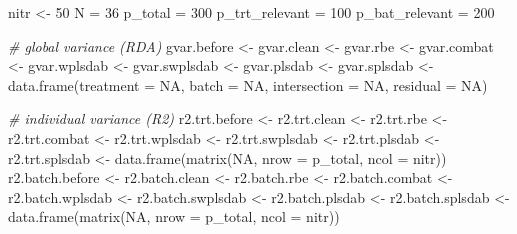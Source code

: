 \documentclass[
]{book}
\newenvironment{Shaded}{\begin{snugshade}}{\end{snugshade}}
\newcommand{\AttributeTok}[1]{\textcolor[rgb]{0.77,0.63,0.00}{#1}}
\newcommand{\CommentTok}[1]{\textcolor[rgb]{0.56,0.35,0.01}{\textit{#1}}}
\newcommand{\ConstantTok}[1]{\textcolor[rgb]{0.00,0.00,0.00}{#1}}
\newcommand{\DecValTok}[1]{\textcolor[rgb]{0.00,0.00,0.81}{#1}}
\newcommand{\FunctionTok}[1]{\textcolor[rgb]{0.00,0.00,0.00}{#1}}
\newcommand{\NormalTok}[1]{#1}
\newcommand{\OtherTok}[1]{\textcolor[rgb]{0.56,0.35,0.01}{#1}}
\begin{document}
\begin{Shaded}
\begin{Highlighting}[]
\NormalTok{nitr }\OtherTok{\textless{}{-}} \DecValTok{50}
\NormalTok{N }\OtherTok{=} \DecValTok{36}
\NormalTok{p\_total }\OtherTok{=} \DecValTok{300}
\NormalTok{p\_trt\_relevant }\OtherTok{=} \DecValTok{100} 
\NormalTok{p\_bat\_relevant }\OtherTok{=} \DecValTok{200} 

\CommentTok{\# global variance (RDA)}
\NormalTok{gvar.before }\OtherTok{\textless{}{-}}\NormalTok{ gvar.clean }\OtherTok{\textless{}{-}} 
\NormalTok{  gvar.rbe }\OtherTok{\textless{}{-}}\NormalTok{ gvar.combat }\OtherTok{\textless{}{-}} 
\NormalTok{  gvar.wplsdab }\OtherTok{\textless{}{-}}\NormalTok{ gvar.swplsdab }\OtherTok{\textless{}{-}} 
\NormalTok{  gvar.plsdab }\OtherTok{\textless{}{-}}\NormalTok{ gvar.splsdab }\OtherTok{\textless{}{-}} \FunctionTok{data.frame}\NormalTok{(}\AttributeTok{treatment =} \ConstantTok{NA}\NormalTok{, }\AttributeTok{batch =} \ConstantTok{NA}\NormalTok{,  }
                                            \AttributeTok{intersection =} \ConstantTok{NA}\NormalTok{, }
                                            \AttributeTok{residual =} \ConstantTok{NA}\NormalTok{)}

\CommentTok{\# individual variance (R2)}
\NormalTok{r2.trt.before }\OtherTok{\textless{}{-}}\NormalTok{ r2.trt.clean }\OtherTok{\textless{}{-}} 
\NormalTok{  r2.trt.rbe  }\OtherTok{\textless{}{-}}\NormalTok{ r2.trt.combat }\OtherTok{\textless{}{-}} 
\NormalTok{  r2.trt.wplsdab }\OtherTok{\textless{}{-}}\NormalTok{ r2.trt.swplsdab }\OtherTok{\textless{}{-}}
\NormalTok{  r2.trt.plsdab }\OtherTok{\textless{}{-}}\NormalTok{ r2.trt.splsdab }\OtherTok{\textless{}{-}} \FunctionTok{data.frame}\NormalTok{(}\FunctionTok{matrix}\NormalTok{(}\ConstantTok{NA}\NormalTok{, }\AttributeTok{nrow =}\NormalTok{ p\_total, }
                                                       \AttributeTok{ncol =}\NormalTok{ nitr))}
\NormalTok{r2.batch.before }\OtherTok{\textless{}{-}}\NormalTok{ r2.batch.clean }\OtherTok{\textless{}{-}} 
\NormalTok{  r2.batch.rbe  }\OtherTok{\textless{}{-}}\NormalTok{ r2.batch.combat }\OtherTok{\textless{}{-}} 
\NormalTok{  r2.batch.wplsdab }\OtherTok{\textless{}{-}}\NormalTok{ r2.batch.swplsdab }\OtherTok{\textless{}{-}}
\NormalTok{  r2.batch.plsdab }\OtherTok{\textless{}{-}}\NormalTok{ r2.batch.splsdab }\OtherTok{\textless{}{-}} \FunctionTok{data.frame}\NormalTok{(}\FunctionTok{matrix}\NormalTok{(}\ConstantTok{NA}\NormalTok{, }\AttributeTok{nrow =}\NormalTok{ p\_total, }
                                                           \AttributeTok{ncol =}\NormalTok{ nitr))}


\end{Highlighting}
\end{Shaded}
\end{document}
